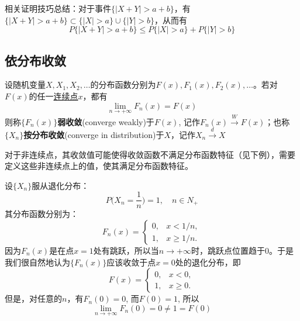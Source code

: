 \begin{note}
    相关证明技巧总结：对于事件$\{ |X+Y| > a+b \}$，有$\{ |X+Y| > a+b \} \subset \{ |X|>a \} \cup \{ |Y|>b \}$，从而有
    \[ P\{ |X+Y| > a+b \} \le P\{ |X|>a \} + P\{ |Y|>b \} \]
\end{note}

\subsection{依分布收敛}

\begin{definition}[依分布收敛]
    设随机变量$X, X_1, X_2, \dotsc$的分布函数分别为$F(x), F_1(x), F_2(x), \dotsc$。若对$F(x)$的任一\underline{连续点}$x$，都有
    \[ \lim_{n \to +\infty} F_n(x) = F(x) \]
    则称$\{ F_n(x) \}$\textbf{弱收敛}(converge weakly)于$F(x)$, 记作$F_n(x) \xrightarrow{W} F(x)$；也称$\{ X_n \}$\textbf{按分布收敛}(converge in distribution)于$X$，记作$X_n \xrightarrow{d} X$
\end{definition}
\begin{remark}
    对于非连续点，其收敛值可能使得收敛函数不满足分布函数特征（见下例），需要定义这些非连续点上的值，使其满足分布函数特征。
\end{remark}

\begin{example}
    设$\{ X_n \}$服从退化分布：
    \[ P \biggl(X_n = \frac1n \biggr) = 1, \quad n \in N_+\]
    其分布函数分别为：
    \[ F_n(x ) = \begin{cases}
            0, & x < 1/n,    \\
            1, & x \geq 1/n.
        \end{cases} \]
    因为$F_n(x)$是在点$x=1$处有跳跃，所以当$n \to +\infty$时，跳跃点位置趋于0。于是我们很自然地认为$\{ F_n(x) \}$应该收敛于点$x=0$处的退化分布，即
    \[ F(x) = \begin{cases}
            0, & x < 0,    \\
            1, & x \geq 0.
        \end{cases} \]
    但是，对任意的$n$，有$F_n(0) = 0$, 而$F(0) = 1$, 所以
    \[ \lim_{n \to +\infty} F_n(0) = 0 \neq 1 = F(0) \]
\end{example}

